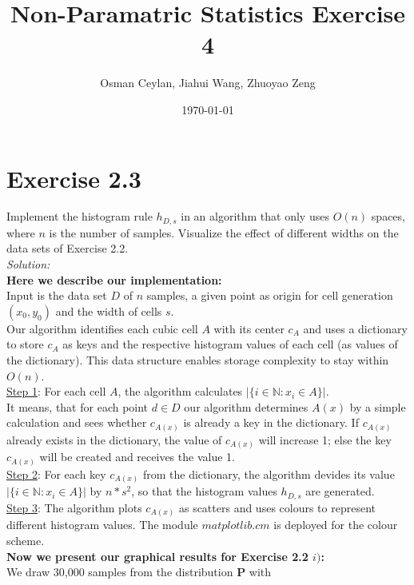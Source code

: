 \documentclass{article}
\title{Non-Paramatric Statistics Exercise 4}
\author{Osman Ceylan, Jiahui Wang, Zhuoyao Zeng}
\date{\today}
\begin{document}
\maketitle

\section*{Exercise 2.3} \vspace*{-1em}
Implement the histogram rule $h_{D,s}$ in an algorithm that only uses $O(n)$ spaces, where $n$ is the number of samples. Visualize the effect of different widths on the data sets of Exercise 2.2.\\
\textit{Solution: }\\
\textbf{Here we describe our implementation:}\\
Input is the data set $D$ of $n$ samples, a given point as origin for cell generation $(x_0,y_0)$ and the width of cells $s$.\\
Our algorithm identifies each cubic cell $A$ with its center $c_A$ and uses a dictionary to store $c_A$ as keys and the respective histogram values of each cell (as values of the dictionary). This data structure enables storage complexity to stay within $O(n)$.\\
\underline{Step 1}: For each cell $A$, the algorithm calculates $|\{ i\in \mathbb{N} : x_i\in A\}|$. \\
It means, that for each point $d \in D$ our algorithm determines $A(x)$ by a simple calculation and sees whether $c_{A(x)}$ is already a key in the dictionary. If $c_{A(x)}$ already exists in the dictionary, the value of $c_{A(x)}$ will increase 1; else the key $c_{A(x)}$ will be created and receives the value 1.\\
\underline{Step 2}: For each key $c_{A(x)}$ from the dictionary, the algorithm devides its value $|\{ i\in \mathbb{N} : x_i\in A\}|$ by $n * s^2$, so that the histogram values $h_{D,s}$ are generated. \\
\underline{Step 3}: The algorithm plots $c_{A(x)}$ as scatters and uses colours to represent different histogram values. The module $matplotlib.cm$ is deployed for the colour scheme. \\
\textbf{Now we present our graphical results for Exercise 2.2 $i)$:} \\
We draw 30,000 samples from the distribution $\mathbf{P}$ with \\
\end{document}
